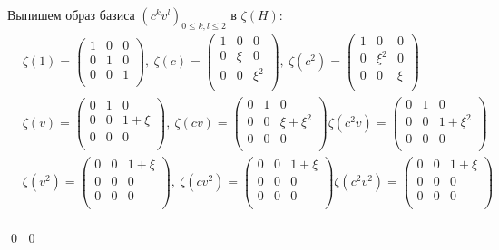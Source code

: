 \documentclass[12pt, reqno, a4paper, oneside, notitlepage]{amsart}
\makeatletter
\theoremstyle{mytheoremstyle}
\theoremstyle{myremarkstyle}
\numberwithin{equation}{section}
\renewenvironment{proof}[1][\proofname]{\par\indent {\bfseries #1\@addpunct{.} }}{\qed}
\makeatother
\begin{document}
\begin{proof}
\begin{proof}
    Выпишем образ базиса $(c^kv^l)_{0 \leq k,l \leq 2}$ в $\zeta(H)$:
    \begin{eqnarray*}
    &\zeta(1) = \begin{pmatrix}
    1 & 0 & 0\\
    0 & 1 & 0\\
    0 & 0 & 1\\
    \end{pmatrix},\
    \zeta(c) = \begin{pmatrix}
    1 & 0 & 0\\
    0 & \xi & 0\\
    0 & 0 & \xi^2\\
    \end{pmatrix},\
    \zeta(c^2) = \begin{pmatrix}
    1 & 0 & 0\\
    0 & \xi^2 & 0\\
    0 & 0 & \xi\\
    \end{pmatrix}\\
    &\zeta(v) = \begin{pmatrix}
    0 & 1 & 0\\
    0 & 0 & 1+\xi\\
    0 & 0 & 0\\
    \end{pmatrix},\
    \zeta(cv) = \begin{pmatrix}
    0 & 1 & 0\\
    0 & 0 & \xi+\xi^2\\
    0 & 0 & 0\\
    \end{pmatrix} 
    \zeta(c^2v) = \begin{pmatrix}
    0 & 1 & 0\\
    0 & 0 & 1+\xi^2\\
    0 & 0 & 0\\
    \end{pmatrix}\\
    &\zeta(v^2) = \begin{pmatrix}
    0 & 0 & 1+\xi\\
    0 & 0 & 0\\
    0 & 0 & 0\\
    \end{pmatrix},\
    \zeta(cv^2) = \begin{pmatrix}
    0 & 0 & 1+\xi\\
    0 & 0 & 0\\
    0 & 0 & 0\\
    \end{pmatrix} 
    \zeta(c^2v^2) = \begin{pmatrix}
    0 & 0 & 1+\xi\\
    0 & 0 & 0\\
    0 & 0 & 0\\
    \end{pmatrix}\\    
    \end{eqnarray*}


\end{proof}
\end{proof}
\end{document}
